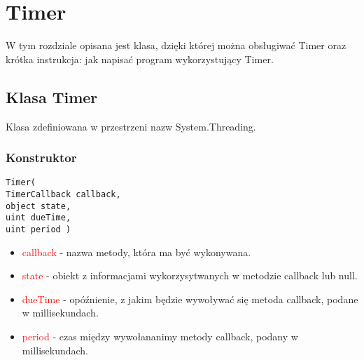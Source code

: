 \documentclass{article}
\begin{document}
\section{Timer}
W tym rozdziale opisana jest klasa, dzięki której można obsługiwać Timer oraz krótka instrukcja: jak napisać program wykorzystujący Timer.
\subsection{Klasa Timer}
Klasa zdefiniowana w przestrzeni nazw System.Threading.
\subsubsection{Konstruktor}
\begin{lstlisting}[frame=single]
Timer(
TimerCallback callback, 
object state, 
uint dueTime, 
uint period )
\end{lstlisting}
\begin{itemize}
\item \textcolor{red}{callback} - nazwa metody, która ma być wykonywana.
\item \textcolor{red}{state} - obiekt z informacjami wykorzysytwanych w metodzie callback lub null.
\item \textcolor{red}{dueTime} - opóźnienie, z jakim będzie wywoływać się metoda callback, podane w millisekundach.
\item \textcolor{red}{period} - czas między wywołananimy metody callback, podany w millisekundach.
\end{itemize}
\end{document}
